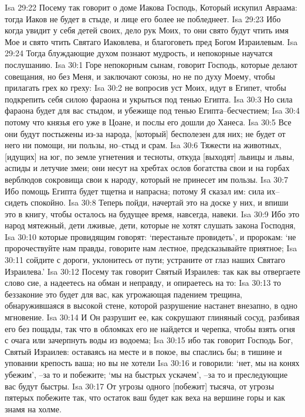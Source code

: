 Isa 29:22  Посему так говорит о доме Иакова Господь, Который искупил Авраама: тогда Иаков не будет в стыде, и лице его более не побледнеет.
Isa 29:23  Ибо когда увидит у себя детей своих, дело рук Моих, то они свято будут чтить имя Мое и свято чтить Святаго Иаковлева, и благоговеть пред Богом Израилевым.
Isa 29:24  Тогда блуждающие духом познают мудрость, и непокорные научатся послушанию.
Isa 30:1  Горе непокорным сынам, говорит Господь, которые делают совещания, но без Меня, и заключают союзы, но не по духу Моему, чтобы прилагать грех ко греху:
Isa 30:2  не вопросив уст Моих, идут в Египет, чтобы подкрепить себя силою фараона и укрыться под тенью Египта.
Isa 30:3  Но сила фараона будет для вас стыдом, и убежище под тенью Египта--бесчестием;
Isa 30:4  потому что князья его уже в Цоане, и послы его дошли до Ханеса.
Isa 30:5  Все они будут постыжены из-за народа, [который] бесполезен для них; не будет от него ни помощи, ни пользы, но--стыд и срам.
Isa 30:6  Тяжести на животных, [идущих] на юг, по земле угнетения и тесноты, откуда [выходят] львицы и львы, аспиды и летучие змеи; они несут на хребтах ослов богатства свои и на горбах верблюдов сокровища свои к народу, который не принесет им пользы.
Isa 30:7  Ибо помощь Египта будет тщетна и напрасна; потому Я сказал им: сила их--сидеть спокойно.
Isa 30:8  Теперь пойди, начертай это на доске у них, и впиши это в книгу, чтобы осталось на будущее время, навсегда, навеки.
Isa 30:9  Ибо это народ мятежный, дети лживые, дети, которые не хотят слушать закона Господня,
Isa 30:10  которые провидящим говорят: `перестаньте провидеть', и пророкам: `не пророчествуйте нам правды, говорите нам лестное, предсказывайте приятное;
Isa 30:11  сойдите с дороги, уклонитесь от пути; устраните от глаз наших Святаго Израилева.'
Isa 30:12  Посему так говорит Святый Израилев: так как вы отвергаете слово сие, а надеетесь на обман и неправду, и опираетесь на то:
Isa 30:13  то беззаконие это будет для вас, как угрожающая падением трещина, обнаружившаяся в высокой стене, которой разрушение настанет внезапно, в одно мгновение.
Isa 30:14  И Он разрушит ее, как сокрушают глиняный сосуд, разбивая его без пощады, так что в обломках его не найдется и черепка, чтобы взять огня с очага или зачерпнуть воды из водоема;
Isa 30:15  ибо так говорит Господь Бог, Святый Израилев: оставаясь на месте и в покое, вы спаслись бы; в тишине и уповании крепость ваша; но вы не хотели
Isa 30:16  и говорили: `нет, мы на конях убежим', --за то и побежите; `мы на быстрых ускачем', --за то и преследующие вас будут быстры.
Isa 30:17  От угрозы одного [побежит] тысяча, от угрозы пятерых побежите так, что остаток ваш будет как веха на вершине горы и как знамя на холме.
